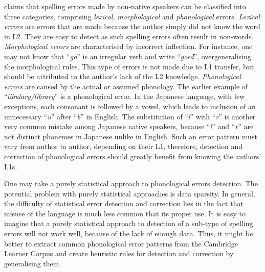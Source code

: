 \documentclass[11pt]{article}
\begin{document}
\cite{rimrott2008evaluating} claims that spelling errors made by non-native 
speakers can be classified into three categories, comprising {\em lexical}, 
{\em morphological} and {\em phonological} errors. {\em Lexical errors} are errors that are made 
because the author simply did not know the word in L2. They are easy to 
detect as such spelling errors often result in non-words. {\em Morphological errors} 
are characterised by incorrect inflection. For instance, one may not know that 
``{\em go}'' is an irregular verb and write ``{\em *goed}'', overgeneralising the 
morphological rules. This type of errors is not made due to L1 transfer, but 
should be attributed to the author's lack of the L2 knowledge. {\em Phonological errors}
are caused by the actual or assumed phonology. The earlier example of 
``{\em *libulary/library}'' is a phonological error. In the Japanese language, with 
few exceptions, each consonant is followed by a vowel, which leads to inclusion of an 
unnecessary ``{\em u}'' after ``{\em b}'' in English.  The substitution of ``{\em l}'' with ``{\em r}'' is another 
very common mistake among Japanese native speakers, because ``{\em l}'' and ``{\em r}'' are 
not distinct phonemes in Japanese unlike in English. Such an error pattern must 
vary from author to author, depending on their L1, therefore, detection and 
correction of phonological errors should greatly benefit from knowing the 
authors' L1s.

One may take a purely statistical approach to phonological errors detection. 
The potential problem with purely statistical approaches is data sparsity. In general, the difficulty of 
statistical error detection and correction lies in the fact that misuse of the 
language is much less common that its proper use. It is easy to imagine that a 
purely statistical approach to detection of a sub-type of spelling errors will not 
work well, because of the lack of enough data. Thus, it might be better to 
extract common phonological error patterns from the Cambridge Learner Corpus and 
create heuristic rules for detection and correction by generalising them.
\end{document}
